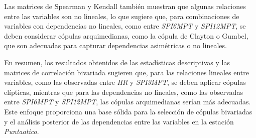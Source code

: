 Las matrices de Spearman y Kendall también muestran que algunas relaciones entre las variables son no lineales, lo que sugiere que, para combinaciones de variables con dependencias no lineales, como entre \textit{SPI6MPT} y \textit{SPI12MPT}, se deben considerar cópulas arquimedianas, como la cópula de Clayton o Gumbel, que son adecuadas para capturar dependencias asimétricas o no lineales. 

En resumen, los resultados obtenidos de las estadísticas descriptivas y las matrices de correlación bivariada sugieren que, para las relaciones lineales entre variables, como las observadas entre \textit{HR} y \textit{SPI3MPT}, se deben aplicar cópulas elípticas, mientras que para las dependencias no lineales, como las observadas entre \textit{SPI6MPT} y \textit{SPI12MPT}, las cópulas arquimedianas serían más adecuadas. Este enfoque proporciona una base sólida para la selección de cópulas bivariadas y el análisis posterior de las dependencias entre las variables en la estación \textit{Puntaatico}.




